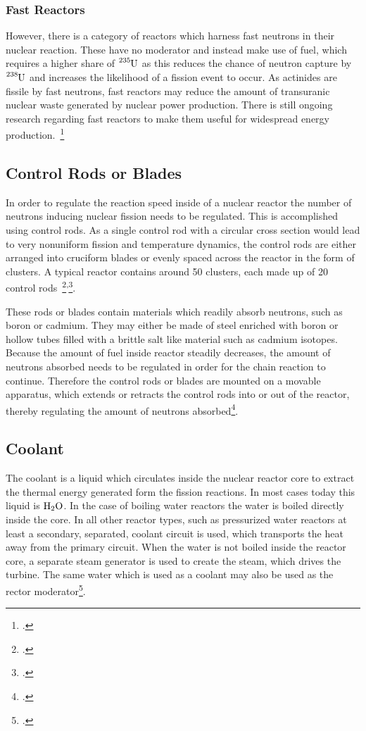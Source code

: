 \subsubsection{Fast Reactors}
However, there is a category of reactors which harness fast neutrons in their nuclear reaction.
These have no moderator and instead make use of fuel, which requires a higher share of $\ce{^{235}U}$
as this reduces the chance of neutron capture by $\ce{^{238}U}$ and increases the likelihood of a fission event to occur.
As actinides are fissile by fast neutrons, fast reactors may reduce the amount of transuranic nuclear waste
generated by nuclear power production. There is still ongoing research regarding fast reactors to make
them useful for widespread energy production.~\footcite{WNPR}


\subsection{Control Rods or Blades}
In order to regulate the reaction speed inside of a nuclear reactor the number of neutrons inducing
nuclear fission needs to be regulated. This is accomplished using control rods.
As a single control rod with a circular cross section would lead to very nonuniform fission and
temperature dynamics, the control rods are either arranged into cruciform blades or evenly spaced
across the reactor in the form of clusters. A typical reactor contains around 50 clusters, each
made up of 20 control rods~\footcite[72]{ReactorPhysics}\textsuperscript{,}\footcite{grayson}.

These rods or blades contain materials which readily absorb neutrons, such as boron or cadmium. %
They may either be made of steel enriched with boron or hollow tubes filled with a brittle salt like material such as cadmium isotopes.
Because the amount of fuel inside reactor steadily decreases, the amount of neutrons absorbed needs to
be regulated in order for the chain reaction to continue. Therefore the control rods or blades are
mounted on a movable apparatus, which extends or retracts the control rods into or out of the reactor,
thereby regulating the amount of neutrons absorbed\footcite{grayson}.

\subsection{Coolant}
The coolant is a liquid which circulates inside the nuclear reactor core to extract the thermal energy
generated form the fission reactions. In most cases today this liquid is $\ce{H_{2}O}$. In the case
of boiling water reactors the water is boiled directly inside the core. In all other reactor types,
such as pressurized water reactors at least a secondary, separated, coolant circuit is used, which
transports the heat away from the primary circuit. When the water is not boiled inside the reactor
core, a separate steam generator is used to create the steam, which drives the turbine. The same
water which is used as a coolant may also be used as the rector moderator\footcite{WNPR}.
